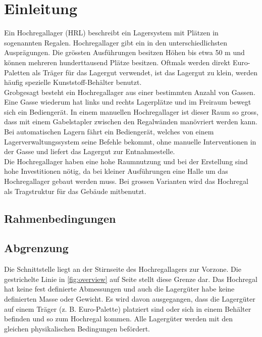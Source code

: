 \section{Einleitung}
Ein Hochregallager (HRL) beschreibt ein Lagersystem mit Plätzen in sogenannten Regalen. Hochregallager gibt ein in den unterschiedlichsten Ausprägungen. Die grössten Ausführungen besitzen Höhen bis etwa 50 m und können mehreren hunderttausend Plätze besitzen. Oftmals werden direkt Euro-Paletten als Träger für das Lagergut verwendet, ist das Lagergut zu klein, werden häufig spezielle Kunststoff-Behälter benutzt.\\
Grobgesagt besteht ein Hochregallager aus einer bestimmten Anzahl von Gassen. Eine Gasse wiederum hat links und rechts Lagerplätze und im Freiraum bewegt sich ein Bediengerät. In einem manuellen Hochregallager ist dieser Raum so gross, dass mit einem Gabelstapler zwischen den Regalwänden manövriert werden kann. Bei automatischen Lagern fährt ein Bediengerät, welches von einem Lagerverwaltungssystem seine Befehle bekommt, ohne manuelle Interventionen in der Gasse und liefert das Lagergut zur Entnahmestelle.\\
Die Hochregallager haben eine hohe Raumnutzung und bei der Erstellung sind hohe Investitionen nötig, da bei kleiner Ausführungen eine Halle um das Hochregallager gebaut werden muss. Bei grossen Varianten wird das Hochregal als Tragstruktur für das Gebäude mitbenutzt. 

%
\subsection{Rahmenbedingungen}

%
\subsection{Abgrenzung}
Die Schnittstelle liegt an der Stirnseite des Hochregallagers zur Vorzone. Die gestrichelte Linie in \ref{fig:overview} auf Seite \pageref{fig:overview} stellt diese Grenze dar. Das Hochregal hat keine fest definierte Abmessungen und auch die Lagergüter habe keine definierten Masse oder Gewicht. Es wird davon ausgegangen, dass die Lagergüter auf einem Träger (z. B. Euro-Palette) platziert sind oder sich in einem Behälter befinden und so zum Hochregal kommen. Alle Lagergüter werden mit den gleichen physikalischen Bedingungen befördert.

